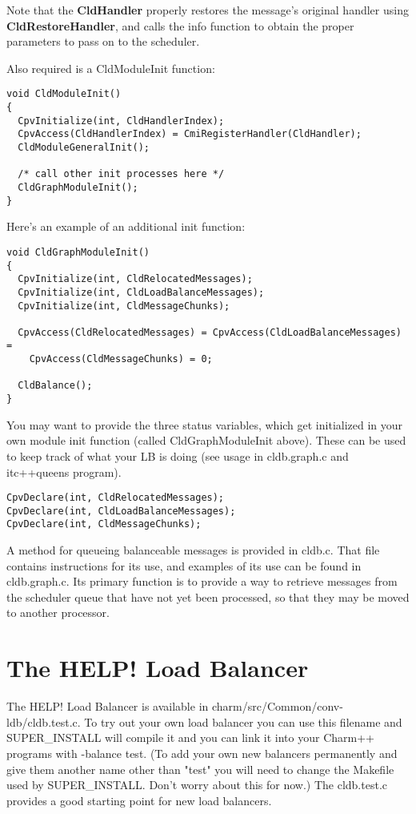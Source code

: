 Note that the {\bf CldHandler} properly restores the message's original
handler using {\bf CldRestoreHandler}, and calls the info function to obtain
the proper parameters to pass on to the scheduler.

Also required is a CldModuleInit function:

\begin{verbatim}
void CldModuleInit()
{
  CpvInitialize(int, CldHandlerIndex);
  CpvAccess(CldHandlerIndex) = CmiRegisterHandler(CldHandler);
  CldModuleGeneralInit();

  /* call other init processes here */
  CldGraphModuleInit();
}
\end{verbatim}

Here's an example of an additional init function:

\begin{verbatim}
void CldGraphModuleInit()
{
  CpvInitialize(int, CldRelocatedMessages);
  CpvInitialize(int, CldLoadBalanceMessages);
  CpvInitialize(int, CldMessageChunks);

  CpvAccess(CldRelocatedMessages) = CpvAccess(CldLoadBalanceMessages) = 
    CpvAccess(CldMessageChunks) = 0;

  CldBalance();
}
\end{verbatim}

You may want to provide the three status variables, which get
initialized in your own module init function (called CldGraphModuleInit
above).  These can be used to keep track of what your LB is doing (see usage
in cldb.graph.c and itc++queens program).

\begin{verbatim}
CpvDeclare(int, CldRelocatedMessages);
CpvDeclare(int, CldLoadBalanceMessages);
CpvDeclare(int, CldMessageChunks);
\end{verbatim}

A method for queueing balanceable messages is provided in cldb.c.  That file
contains instructions for its use, and examples of its use can be found in
cldb.graph.c.  Its primary function is to provide a way to retrieve messages
from the scheduler queue that have not yet been processed, so that they may be
moved to another processor.


\section{The HELP! Load Balancer}

The HELP! Load Balancer is available in
charm/src/Common/conv-ldb/cldb.test.c.  To try out your own load balancer you
can use this filename and SUPER\_INSTALL will compile it and you can link it
into your Charm++ programs with -balance test.  (To add your own new balancers
permanently and give them another name other than "test" you will need to
change the Makefile used by SUPER\_INSTALL. Don't worry about this for now.)
The cldb.test.c provides a good starting point for new load balancers.

